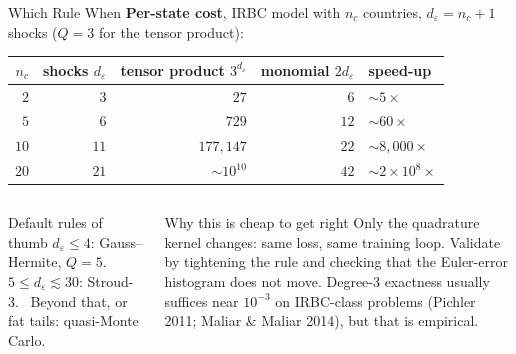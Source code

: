 \documentclass[aspectratio=169,11pt]{beamer}
\newcommand{\emphc}[1]{\textcolor{harvardcrimson}{#1}}
\begin{document}
\begin{frame}{Which Rule When}
\textbf{Per-state cost}, IRBC model with $n_c$ countries, $d_\varepsilon = n_c+1$ shocks ($Q=3$ for the tensor product):
\begin{center}
\renewcommand{\arraystretch}{1.05}
\footnotesize
\begin{tabular}{@{}rrrrl@{}}
\toprule
$n_c$ & shocks $d_\varepsilon$ & tensor product $3^{d_\varepsilon}$ & monomial $2d_\varepsilon$ & speed-up\\
\midrule
$2$  & $3$  & $27$           & $6$   & $\sim\! 5\times$\\
$5$  & $6$  & $729$          & $12$  & $\sim\! 60\times$\\
$10$ & $11$ & $177{,}147$    & $22$  & $\sim\! 8{,}000\times$\\
$20$ & $21$ & $\sim\! 10^{10}$ & $42$  & $\sim\! 2\!\times\!10^8\times$\\
\bottomrule
\end{tabular}
\end{center}

\begin{columns}[T]
\begin{block}{Default rules of thumb}
\footnotesize
$d_\varepsilon \le 4$: Gauss--Hermite, $Q=5$. \ $5 \le d_\varepsilon \lesssim 30$: Stroud-3. \ Beyond that, or fat tails: quasi-Monte Carlo.
\end{block}

\begin{exampleblock}{Why this is cheap to get right}
\footnotesize
Only the quadrature \emphc{kernel} changes: same loss, same training loop. Validate by tightening the rule and checking that the Euler-error histogram does not move. Degree-3 exactness usually suffices near $10^{-3}$ on IRBC-class problems (Pichler 2011; Maliar \& Maliar 2014), but that is empirical.
\end{exampleblock}
\end{columns}
\end{frame}
\end{document}
